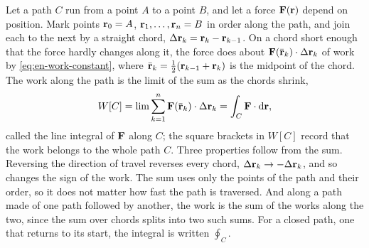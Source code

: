 \begin{toolbox}
Let a path $C$ run from a point $A$ to a point $B$, and let a force
$\bm{\mathrm{F}}(\bm{\mathrm{r}})$ depend on position. Mark points $\bm{\mathrm{r}}_0 = A$,
$\bm{\mathrm{r}}_1, \dots, \bm{\mathrm{r}}_n = B$ in order along the path, and join each to
the next by a straight chord, $\Delta\bm{\mathrm{r}}_k = \bm{\mathrm{r}}_k -
\bm{\mathrm{r}}_{k-1}$. On a chord short enough that the force hardly changes
along it, the force does about $\bm{\mathrm{F}}(\bar{\bm{\mathrm{r}}}_k)\cdot\Delta
\bm{\mathrm{r}}_k$ of work by \cref{eq:en-work-constant}, where $\bar{\bm{\mathrm{r}}}_k =
\frac12(\bm{\mathrm{r}}_{k-1} + \bm{\mathrm{r}}_k)$ is the midpoint of the chord. The work
along the path is the limit of the sum as the chords shrink,
\begin{equation*}
   W[C] = \lim\sum_{k=1}^{n}\bm{\mathrm{F}}(\bar{\bm{\mathrm{r}}}_k)\cdot\Delta\bm{\mathrm{r}}_k
   = \int_C \bm{\mathrm{F}}\cdot\mathrm{d}\bm{\mathrm{r}} ,
\end{equation*}
called the line integral of $\bm{\mathrm{F}}$ along $C$; the square brackets in
$W[C]$ record that the work belongs to the whole path $C$.
Three properties follow from the sum. Reversing the direction of travel
reverses every chord, $\Delta\bm{\mathrm{r}}_k \to -\Delta\bm{\mathrm{r}}_k$, and so changes
the sign of the work. The sum uses only the points of the path and their
order, so it does not matter how fast the path is traversed. And along a
path made of one path followed by another, the work is the sum of the
works along the two, since the sum over chords splits into two such sums.
For a closed path, one that returns to its start, the integral is written
$\oint_C$.


\end{toolbox}
